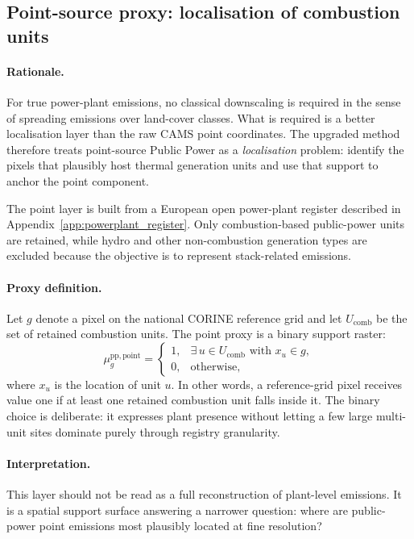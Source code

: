\subsection{Point-source proxy: localisation of combustion units}

\paragraph{Rationale.}
For true power-plant emissions, no classical downscaling is required in the
sense of spreading emissions over land-cover classes. What is required is a
better localisation layer than the raw CAMS point coordinates. The upgraded
method therefore treats point-source Public Power as a \emph{localisation}
problem: identify the pixels that plausibly host thermal generation units and
use that support to anchor the point component.

The point layer is built from a European open power-plant register described
in Appendix~\ref{app:powerplant_register}. Only combustion-based public-power
units are retained, while hydro and other non-combustion generation types are
excluded because the objective is to represent stack-related emissions.

\paragraph{Proxy definition.}
Let $g$ denote a pixel on the national CORINE reference grid and let
$U_{\mathrm{comb}}$ be the set of retained combustion units. The point proxy is
a binary support raster:
\begin{equation}
  \mu_{g}^{\mathrm{pp,point}} =
  \begin{cases}
    1, & \exists\,u \in U_{\mathrm{comb}} \text{ with } x_u \in g,\\
    0, & \text{otherwise},
  \end{cases}
\end{equation}
where $x_u$ is the location of unit $u$. In other words, a reference-grid
pixel receives value one if at least one retained combustion unit falls inside
it. The binary choice is deliberate: it expresses plant presence without
letting a few large multi-unit sites dominate purely through registry
granularity.

\paragraph{Interpretation.}
This layer should not be read as a full reconstruction of plant-level
emissions. It is a spatial support surface answering a narrower question:
where are public-power point emissions most plausibly located at fine
resolution?

